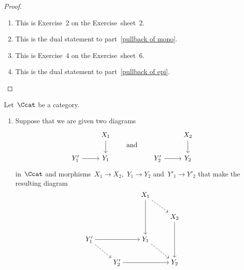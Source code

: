 \begin{proof}
  \leavevmode
  \begin{enumerate}
    \item
      This is Exercise~2 on the Exercise~sheet~2.
    \item
      This is the dual statement to part~\ref*{pullback of mono}.
    \item
      This is Exercise~4 on the Exercise~sheet~6.
    \item
      This is the dual statement to part~\ref*{pullback of epi}.
    \qedhere
  \end{enumerate}
\end{proof}


\begin{remark*}
  \label{functoriality of pullback and pushout}
  Let~$\Ccat$ be a category.
  \begin{enumerate}
    \item
      Suppose that we are given two diagrams
      \[
        \begin{tikzcd}
            {}
          & X_1
            \arrow{d}
          \\
            Y'_1
            \arrow{r}
          & Y_1
        \end{tikzcd}
        \qquad\text{and}\qquad
        \begin{tikzcd}
            {}
          & X_2
            \arrow{d}
          \\
            Y'_2
            \arrow{r}
          & Y_2
        \end{tikzcd}
      \]
      in~$\Ccat$ and morphisms~$X_1 \to X_2$,~$Y_1 \to Y_2$ and~$Y'_1 \to Y'_2$ that make the resulting diagram
      \begin{equation}
        \label{morphism between prepullbacks}
        \begin{tikzcd}[cramped]
            {}
          & {}
          & X_1
            \arrow{dd}
            \arrow[dashed]{dr}
          & {}
          \\
            {}
          & {}
          & {}
          & X_2
            \arrow{dd}
          \\
            Y'_1
            \arrow{rr}
            \arrow[dashed]{dr}
          & {}
          & Y_1
            \arrow[dashed]{dr}
          & {}
          \\
            {}
          & Y'_2
            \arrow{rr}
          & {}
          & Y_2
          \\

\end{tikzcd}
\end{equation}
\end{enumerate}
\end{remark*}
